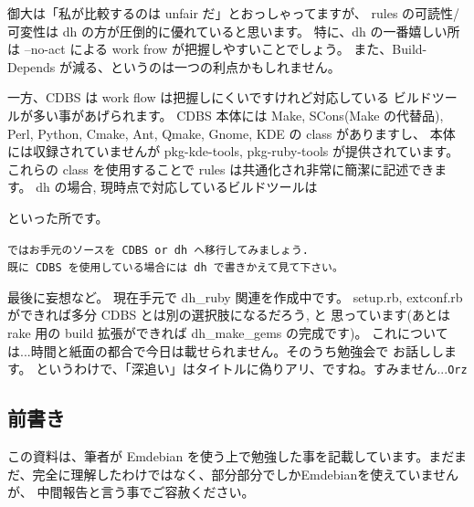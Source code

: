 \documentclass[mingoth,a4paper]{jsarticle}
\begin{document}
御大は「私が比較するのは unfair だ」とおっしゃってますが、
rules の可読性/可変性は dh の方が圧倒的に優れていると思います。
特に、dh の一番嬉しい所は
--no-act による work frow が把握しやすいことでしょう。
また、Build-Depends が減る、というのは一つの利点かもしれません。

一方、CDBS は work flow は把握しにくいですけれど対応している
ビルドツールが多い事があげられます。
CDBS 本体には Make, SCons(Make の代替品), 
Perl, Python, Cmake, Ant,  Qmake, Gnome, KDE の class がありますし、
本体には収録されていませんが pkg-kde-tools, pkg-ruby-tools が提供されています。
これらの class を使用することで rules は共通化され非常に簡潔に記述できます。
dh の場合, 現時点で対応しているビルドツールは
といった所です。


\begin{center}
    {\tt ではお手元のソースを CDBS or dh へ移行してみましょう. \\
    既に CDBS を使用している場合には dh で書きかえて見て下さい。}
\end{center}

最後に妄想など。
%
現在手元で dh\_ruby 関連を作成中です。
setup.rb, extconf.rb ができれば多分 CDBS とは別の選択肢になるだろう, と
思っています(あとは rake 用の build 拡張ができれば dh\_make\_gems の完成です)。
これについては...時間と紙面の都合で今日は載せられません。そのうち勉強会で
お話しします。
というわけで、「深追い」はタイトルに偽りアリ、ですね。すみません...{\tt Orz}



\subsection{前書き}

この資料は、筆者が Emdebian を使う上で勉強した事を記載しています。まだま
だ、完全に理解したわけではなく、部分部分でしかEmdebianを使えていませんが、
中間報告と言う事でご容赦ください。
\end{document}
